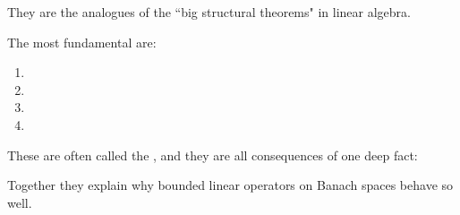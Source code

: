 \documentclass[12pt,a4paper]{report}
\begin{document}
They are the analogues of the ``big structural theorems" in linear algebra.

The most fundamental are:
\begin{enumerate}
\item {}
\item {}
\item {}
\item {}
\end{enumerate}
These are often called the , and they are all consequences of one deep fact:

\> 

Together they explain why bounded linear operators on Banach spaces behave so well.
\end{document}
